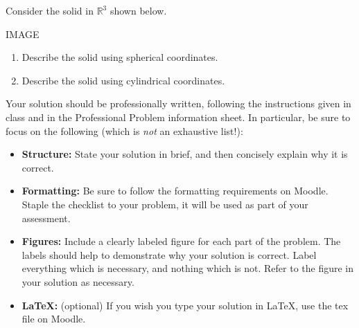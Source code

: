 \begin{problem}
Consider the solid in $\mathbb{R}^3$ shown below.

IMAGE

\begin{enumerate}
\item Describe the solid using spherical coordinates.
\item Describe the solid using cylindrical coordinates.
\end{enumerate}

Your solution should be professionally written, following the instructions given in class and in the Professional Problem information sheet. In particular, be sure to focus on the following (which is \emph{not} an exhaustive list!):
\begin{itemize}
	\item \textbf{Structure:} State your solution in brief, and then concisely explain why it is correct.
	\item \textbf{Formatting:} Be sure to follow the formatting requirements on Moodle. Staple the checklist to your problem, it will be used as part of your assessment.
	\item \textbf{Figures:} Include a clearly labeled figure for each part of the problem. The labels should help to demonstrate why your solution is correct. Label everything which is necessary, and nothing which is not. Refer to the figure in your solution as necessary.
	\item \textbf{\LaTeX:} (optional) If you wish you type your solution in \LaTeX, use the tex file on Moodle.
\end{itemize}
\end{problem}